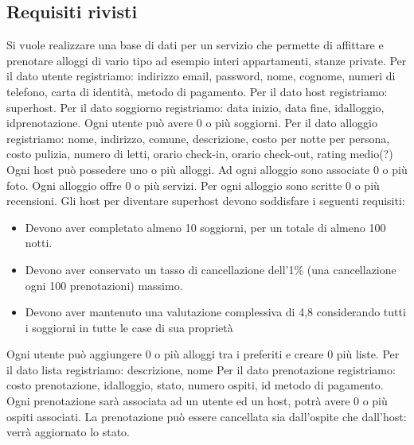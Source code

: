 \subsection{Requisiti rivisti}
Si vuole realizzare una base di dati per un servizio che permette di affittare e prenotare
alloggi di vario tipo ad esempio interi appartamenti, stanze private.
\newline
\newline
Per il dato utente registriamo: indirizzo email, password, nome, cognome, numeri di telefono, carta di identità, metodo di pagamento.
\newline
\newline
Per il dato host registriamo: superhost.
\newline
\newline
Per il dato soggiorno registriamo: data inizio, data fine, idalloggio, idprenotazione.
Ogni utente può avere 0 o più soggiorni.
\newline
\newline
Per il dato alloggio registriamo: nome, indirizzo, comune, descrizione, costo per notte per  persona, costo pulizia, numero di letti, orario check-in, orario check-out, rating medio(?)
Ogni host può possedere uno o più alloggi. Ad ogni alloggio sono associate 0 o più foto. Ogni alloggio offre 0 o più servizi. Per ogni alloggio sono scritte 0 o più recensioni.
\newline
\newline
Gli host per diventare superhost devono soddisfare i  seguenti requisiti:
\begin{itemize}
    \item Devono aver completato almeno 10 soggiorni, per un totale di almeno 100 notti.
    \item Devono aver conservato un tasso di cancellazione dell'1\% 
    (una cancellazione ogni 100 prenotazioni) massimo.
    \item Devono aver mantenuto una valutazione complessiva di 4,8 considerando 
    tutti i soggiorni in tutte le case di sua proprietà
\end{itemize}
Ogni utente può aggiungere 0 o più alloggi tra i preferiti e creare 0 più liste.
Per il dato lista registriamo: descrizione, nome
\newline
\newline
Per il dato prenotazione registriamo: costo prenotazione, idalloggio, stato, numero ospiti, id metodo di pagamento. Ogni prenotazione sarà associata ad un utente ed un host, potrà avere 0 o più ospiti associati. La prenotazione può essere cancellata sia dall'ospite che dall'host: verrà aggiornato lo stato.
